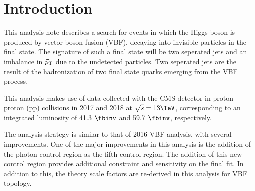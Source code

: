 \section{Introduction} \label{section:introduction}

This analysis note describes a search for events in which the Higgs boson is produced by vector boson fusion (VBF), 
decaying into invisible particles in the final state. The signature of such a final state will be two seperated jets 
and an imbalance in $\vec{p}_{\rm T}$ due to the undetected particles. Two seperated jets are the result of the 
hadronization of two final state quarks emerging from the VBF process.

This analysis makes use of data collected with the CMS detector in proton-proton (pp) collisions in 2017 
and 2018 at $\sqrt{s}=13\TeV$, corresponding to an integrated luminosity of 41.3 $\fbinv$ and 59.7 $\fbinv$, 
respectively. 

The analysis strategy is similar to that of 2016 VBF analysis, with several improvements. One of the major 
improvements in this analysis is the addition of the photon control region as the fifth control region. 
The addition of this new control region provides additional constraint and sensitivity on the final fit.
In addition to this, the theory scale factors are re-derived in this analysis for VBF topology.